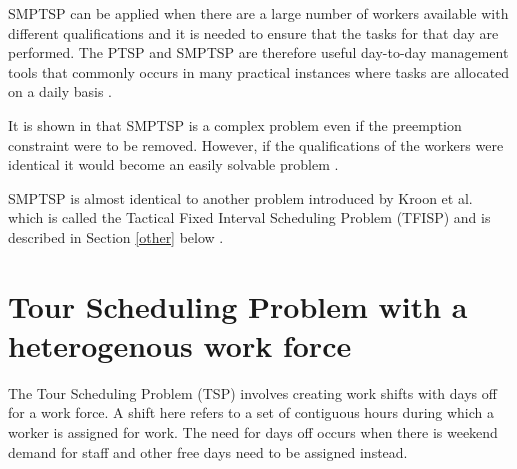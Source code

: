 SMPTSP can be applied when there are a large number of workers available with different qualifications and it is needed to ensure that the tasks for that day are performed. The PTSP and SMPTSP are therefore useful day-to-day management tools that commonly occurs in many practical instances where tasks are allocated on a daily basis \cite{krishnamoorthy_2011}.

It is shown in \cite{kroon_1997} that SMPTSP is a complex problem even if the preemption constraint were to be removed. However, if the qualifications of the workers were identical it would become an easily solvable problem \cite{krishnamoorthy_2011}.

SMPTSP is almost identical to another problem introduced by Kroon et al. which is called the Tactical Fixed Interval Scheduling Problem (TFISP) and is described in Section \ref{other} below \cite{krishnamoorthy_2011}.




 

%
%
%
%


\section{Tour Scheduling Problem with a heterogenous work force}\label{TSP}

The Tour Scheduling Problem (TSP) involves creating work shifts with days off for a work force. A shift here refers to a set of contiguous hours during which a worker is assigned for work. The need for days off occurs when there is weekend demand for staff and other free days need to be assigned instead. 

